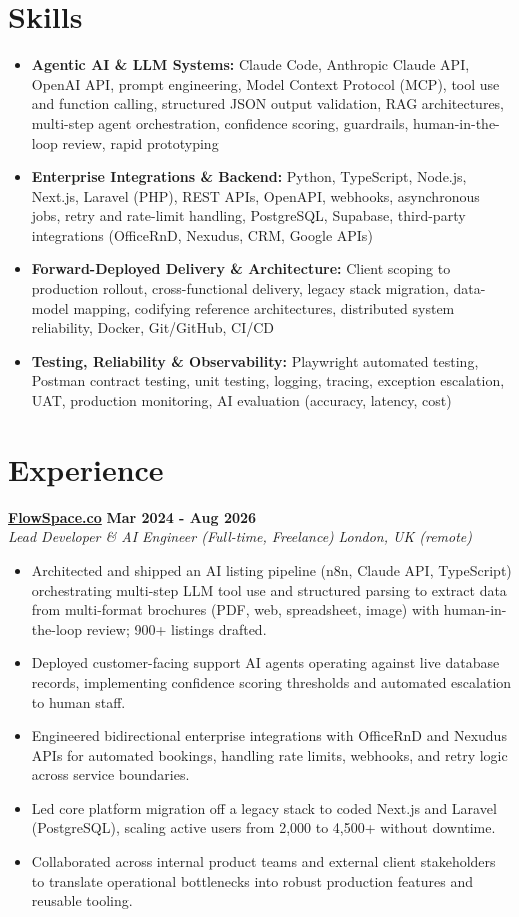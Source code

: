 \documentclass[a4paper,10pt]{article}
\newcommand{\role}[4]{%
  \textbf{#1} \hfill \textbf{#2}\\[1pt]%
  \textit{#3} \hfill \textit{#4}\\[2pt]%
}
\begin{document}
\section{Skills}
\begin{itemize}
  \item \textbf{Agentic AI \& LLM Systems:} Claude Code, Anthropic Claude API, OpenAI API, prompt engineering, Model Context Protocol (MCP), tool use and function calling, structured JSON output validation, RAG architectures, multi-step agent orchestration, confidence scoring, guardrails, human-in-the-loop review, rapid prototyping
  \item \textbf{Enterprise Integrations \& Backend:} Python, TypeScript, Node.js, Next.js, Laravel (PHP), REST APIs, OpenAPI, webhooks, asynchronous jobs, retry and rate-limit handling, PostgreSQL, Supabase, third-party integrations (OfficeRnD, Nexudus, CRM, Google APIs)
  \item \textbf{Forward-Deployed Delivery \& Architecture:} Client scoping to production rollout, cross-functional delivery, legacy stack migration, data-model mapping, codifying reference architectures, distributed system reliability, Docker, Git/GitHub, CI/CD
  \item \textbf{Testing, Reliability \& Observability:} Playwright automated testing, Postman contract testing, unit testing, logging, tracing, exception escalation, UAT, production monitoring, AI evaluation (accuracy, latency, cost)
\end{itemize}

\section{Experience}

\role{\href{https://flowspace.co}{FlowSpace.co}}{Mar 2024 - Aug 2026}{Lead Developer \& AI Engineer (Full-time, Freelance)}{London, UK (remote)}
\begin{itemize}
  \item Architected and shipped an AI listing pipeline (n8n, Claude API, TypeScript) orchestrating multi-step LLM tool use and structured parsing to extract data from multi-format brochures (PDF, web, spreadsheet, image) with human-in-the-loop review; 900+ listings drafted.
  \item Deployed customer-facing support AI agents operating against live database records, implementing confidence scoring thresholds and automated escalation to human staff.
  \item Engineered bidirectional enterprise integrations with OfficeRnD and Nexudus APIs for automated bookings, handling rate limits, webhooks, and retry logic across service boundaries.
  \item Led core platform migration off a legacy stack to coded Next.js and Laravel (PostgreSQL), scaling active users from 2,000 to 4,500+ without downtime.
  \item Collaborated across internal product teams and external client stakeholders to translate operational bottlenecks into robust production features and reusable tooling.
\end{itemize}
\end{document}
